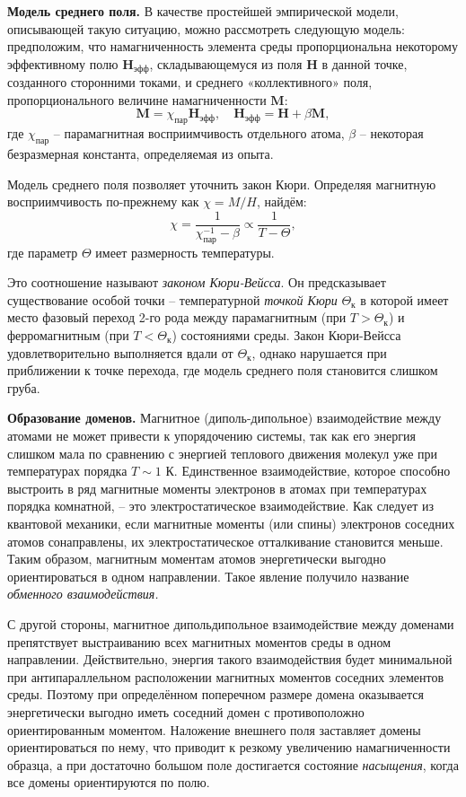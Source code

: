 \documentclass[a4paper,12pt]{article}
\begin{document}
\textbf{Модель среднего поля.} 
В качестве простейшей эмпирической модели, описывающей такую ситуацию, можно рассмотреть следующую модель: предположим, что намагниченность элемента среды пропорциональна некоторому эффективному полю $\mathbf{H}_{эфф}$, складывающемуся из поля $\mathbf{H}$ в данной точке, созданного сторонними токами, и среднего «коллективного» поля, пропорционального величине намагниченности $\mathbf{M}$:
\[\mathbf{M} = \chi_{пар} \mathbf{H}_{эфф}, \quad \mathbf{H}_{эфф} = \mathbf{H} + \beta \mathbf{M},\]
где $\chi_{пар}$ -- парамагнитная восприимчивость отдельного атома, $\beta$ -- некоторая безразмерная константа, определяемая из опыта. 

Модель среднего поля позволяет уточнить закон Кюри. Определяя
магнитную восприимчивость по-прежнему как $\chi = M / H$,  найдём:
\[\chi = \frac{1}{\chi_{пар}^{-1} - \beta} \propto \frac{1}{T - \Theta},\]
где параметр $\Theta$ имеет размерность температуры.

Это соотношение называют \textit{законом Кюри-Вейсса}. Он предсказывает существование особой точки -- температурной \textit{точкой Кюри} $\Theta_к$ в которой имеет место фазовый переход 2-го рода между парамагнитным (при $T > \Theta_к$) и ферромагнитным (при $T < \Theta_к$) состояниями среды. Закон Кюри-Вейсса удовлетворительно выполняется вдали от $\Theta_к$, однако нарушается при приближении к точке перехода, где модель среднего поля становится слишком груба.

\textbf{Образование доменов.} 
Магнитное (диполь-дипольное) взаимодействие между атомами не может привести к упорядочению системы, так как его энергия слишком мала по сравнению с энергией теплового движения молекул уже при температурах порядка $T \sim 1$ К. Единственное взаимодействие, которое способно выстроить в ряд магнитные моменты электронов в атомах при температурах порядка комнатной, -- это электростатическое взаимодействие. Как следует из квантовой механики, если магнитные моменты (или спины) электронов соседних атомов сонаправлены, их электростатическое отталкивание становится меньше. Таким образом, магнитным моментам атомов энергетически выгодно ориентироваться в одном направлении. Такое явление получило название \textit{обменного взаимодействия.} 

С другой стороны, магнитное дипольдипольное взаимодействие между доменами препятствует выстраиванию всех магнитных моментов среды в одном направлении. Действительно, энергия такого взаимодействия будет минимальной при антипараллельном расположении магнитных моментов соседних элементов среды. Поэтому при определённом поперечном размере домена оказывается энергетически выгодно иметь соседний домен с противоположно ориентированным моментом. Наложение внешнего поля заставляет домены ориентироваться по нему, что приводит к резкому увеличению намагниченности образца, а при достаточно большом поле достигается состояние \textit{насыщения}, когда все домены ориентируются по полю. 
\end{document}
